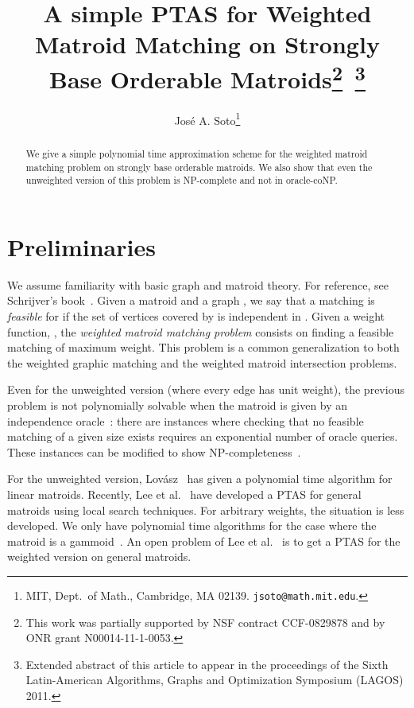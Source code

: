 \documentclass[letterpaper,11pt]{article}
\newcommand{\NP}{{\textrm NP}}
\theoremstyle{definition}
\begin{document}
\title{A simple PTAS for Weighted Matroid Matching on Strongly Base Orderable Matroids\footnote{This work was partially supported by NSF
  contract CCF-0829878 and by ONR grant N00014-11-1-0053.}\, \footnote{Extended abstract of this article to appear in the proceedings of the Sixth Latin-American Algorithms, Graphs and Optimization Symposium (LAGOS) 2011.}}
\author{Jos\'e A. Soto\thanks{MIT,
Dept.~of Math., Cambridge, MA 02139. \texttt{jsoto@math.mit.edu}.}}
\date{}
\maketitle

\begin{abstract}
We give a simple polynomial time approximation scheme for the weighted matroid matching problem on strongly base orderable matroids. We also show that even the unweighted version of this problem is NP-complete and not in oracle-coNP.
\end{abstract}



\section{Preliminaries}
We assume familiarity with basic graph and matroid theory. For reference, see Schrijver's book~\cite{Schrijver-book}. Given a matroid  and a graph , we say that a matching  is  \emph{feasible} for  if the set  of vertices covered by  is independent in . Given a weight function, , the \emph{weighted matroid matching problem} consists on finding a feasible matching of maximum weight. This problem is a common generalization to both the weighted graphic matching and the weighted matroid intersection problems.

Even for the unweighted version (where every edge has unit weight), the previous problem is not polynomially solvable when the matroid is given by an independence oracle~\cite{JensenK82,Lovasz81}: there are instances where checking that no feasible matching of a given size exists requires an exponential number of oracle queries. These instances can be modified to show \NP-completeness~\cite{Schrijver-book}.

For the unweighted version, Lov\'asz~\cite{Lovasz81} has given a polynomial time algorithm for linear matroids. Recently, Lee et al.~\cite{LeeSV10} have developed a PTAS for general matroids using local search techniques. For arbitrary weights, the situation is less developed. We only have polynomial time algorithms for the case where the matroid is a gammoid~\cite{tong1982solving}. An open problem of Lee et al.~\cite{LeeSV10} is to get a PTAS for the weighted version on general matroids.
\end{document}
